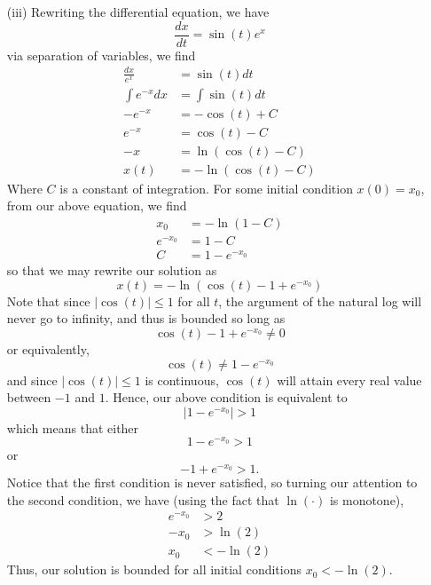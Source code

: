 \documentclass{article}
\begin{document}
\begin{itemize}
\begin{itemize}
        \item[(iii)] Rewriting the differential equation, we have
        \[\frac{dx}{dt} = \sin(t)e^x\]
        via separation of variables, we find
        \begin{align*}
            \frac{dx}{e^x} &= \sin(t)dt\\
            \int e^{-x} dx &= \int\sin(t)dt\\
            -e^{-x} &= -\cos(t) + C\\
            e^{-x} &= \cos(t) - C\\
            -x &= \ln(\cos(t) - C)\\
            x(t) &= -\ln(\cos(t) - C)
        \end{align*}
        Where $C$ is a constant of integration. For some initial condition $x(0) = x_0$, from our above equation, we find
        \begin{align*}
            x_0 &= -\ln(1 - C)\\
            e^{-x_0} &= 1 - C\\
            C &= 1 - e^{-x_0}
        \end{align*}
        so that we may rewrite our solution as
        \[x(t) = -\ln(\cos(t) - 1 + e^{-x_0})\]
        Note that since $|\cos(t)| \leq 1$ for all $t$, the argument of the natural log will never go to infinity, and thus is bounded so long as 
        \[\cos(t) - 1 + e^{-x_0} \neq 0\]
        or equivalently, 
        \[\cos(t) \neq 1 - e^{-x_0}\]
        and since $|\cos(t)| \leq 1$ is continuous, $\cos(t)$ will attain every real value between $-1$ and $1$. Hence, our above condition is equivalent to
        \[|1 - e^{-x_0}| > 1\]
        which means that either
        \[1 - e^{-x_0} > 1\]
        or 
        \[-1 + e^{-x_0} > 1.\]
        Notice that the first condition is never satisfied, so turning our attention to the second condition, we have (using the fact that $\ln(\cdot)$ is monotone),
        \begin{align*}
            e^{-x_0} &> 2\\
            -x_0 &> \ln(2)\\
            x_0 &< -\ln(2)
        \end{align*}
        Thus, our solution is bounded for all initial conditions $x_0 < -\ln(2)$.


\end{itemize}
\end{itemize}
\end{document}
